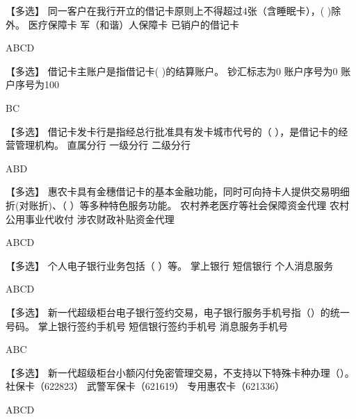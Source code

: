 \documentclass[kindlepaper]{BHCexam4kindle}
\begin{document}
\begin{questions}
\qs 【多选】 同一客户在我行开立的借记卡原则上不得超过4张（含睡眠卡），(    )除外。 \xx
{} {  医疗保障卡 } { 军（和谐）人保障卡 } { 已销户的借记卡 }
\begin{solution} ABCD \end{solution}
\qs 【多选】 借记卡主账户是指借记卡(    )的结算账户。 \xx
{} {  钞汇标志为0 } { 账户序号为0 } { 账户序号为100 }
\begin{solution} BC \end{solution}
\qs 【多选】 借记卡发卡行是指经总行批准具有发卡城市代号的（   ），是借记卡的经营管理机构。 \xx
{} {  直属分行 } { 一级分行 } { 二级分行 }
\begin{solution} ABD \end{solution}
\qs 【多选】 惠农卡具有金穗借记卡的基本金融功能，同时可向持卡人提供交易明细折(对账折)、（    ）等多种特色服务功能。 \xx
{} {  农村养老医疗等社会保障资金代理 } { 农村公用事业代收付 } { 涉农财政补贴资金代理 }
\begin{solution} ABCD \end{solution}
\qs 【多选】 个人电子银行业务包括（  ）等。 \xx
{} {  掌上银行 } { 短信银行 } { 个人消息服务 }
\begin{solution} ABCD \end{solution}
\qs 【多选】 新一代超级柜台电子银行签约交易，电子银行服务手机号指（）的统一号码。 \xx
{} {  掌上银行签约手机号 } { 短信银行签约手机号 } { 消息服务手机号 }
\begin{solution} ABC \end{solution}
\qs 【多选】 新一代超级柜台小额闪付免密管理交易，不支持以下特殊卡种办理（）。 \xx
{} {  社保卡（622823） } { 武警军保卡（621619） } { 专用惠农卡（621336） }
\begin{solution} ABCD \end{solution}

\end{questions}
\end{document}
